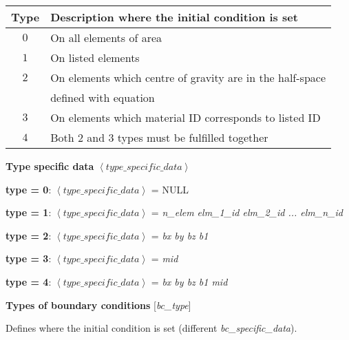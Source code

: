 \documentclass[a4paper]{article}
\begin{document}
\begin{table}[ht]

		\begin{tabular}{||c|l||}
				\hline
				Type				&	Description where the initial condition is set\\\hline\hline
				$0$					&	On all elements of area\\\hline
				$1$					&	On listed elements\\\hline
				$2$					&	On elements which centre of gravity are in the half-space\\ 
										& defined with equation\\\hline   %
		  	$3$					&	On elements which material ID corresponds to listed ID\\\hline
		  	$4$					&	Both 2 and 3 types must be fulfilled together\\\hline
		\end{tabular}
\end{table}

\newpage

\begin{flushleft}
\textbf{Type specific data} $\left\langle type\_specific\_data\right\rangle$
\end{flushleft}

\textbf{type = 0}: \quad
 $\left\langle type\_specific\_data\right\rangle$ = NULL

\textbf{type = 1}: \quad
 $\left\langle type\_specific\_data\right\rangle$ = \textit{n\_elem elm\_1\_id elm\_2\_id ... elm\_n\_id}

\textbf{type = 2}: \quad
 $\left\langle type\_specific\_data\right\rangle$ = \textit{bx by bz b1}

\textbf{type = 3}: \quad
 $\left\langle type\_specific\_data\right\rangle$ = \textit{mid}

\textbf{type = 4}: \quad
 $\left\langle type\_specific\_data\right\rangle$ = \textit{bx by bz b1 mid}


\begin{flushleft}
\textbf{Types of boundary conditions} [\textit{bc\_type}]
\end{flushleft}

\vspace{-10pt}
Defines where the initial condition is set (different \textit{bc\_specific\_data}).
\vspace{-5pt}
\end{document}
